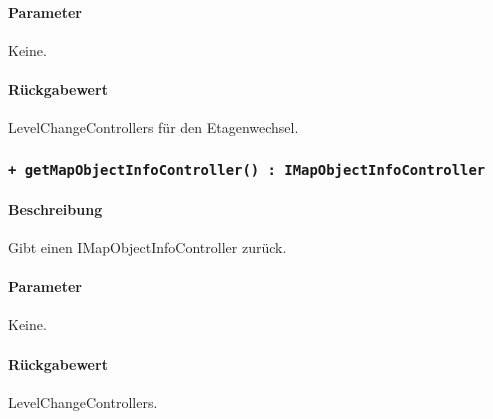 \paragraph*{Parameter}
Keine.
\paragraph*{Rückgabewert}
LevelChangeControllers für den Etagenwechsel.

\subsubsection{\texttt{+ getMapObjectInfoController() : IMapObjectInfoController}}%
\paragraph*{Beschreibung}
Gibt einen IMapObjectInfoController zurück.
\paragraph*{Parameter}
Keine.
\paragraph*{Rückgabewert}
LevelChangeControllers.
